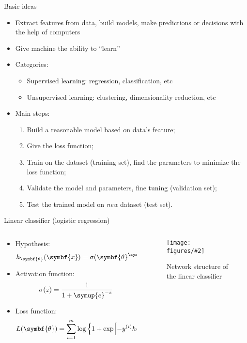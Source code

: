 \documentclass[aspectratio=169]{beamer}
\def\ee{{\symup{e}}}
\def\trans{{\symup{T}}}
\def\bm#1{{\symbf{#1}}}
\newcommand\imageinput[2][]{\texttt{[image: figures/\#2]}}
\begin{document}
\begin{frame}{Basic ideas}
\begin{itemize}
  \item Extract features from data, build models, make predictions or decisions with the help of
    computers
  \item Give machine the ability to ``learn''
  \item Categories:
    \begin{itemize}
      \item Supervised learning: regression, classification, etc
      \item Unsupervised learning: clustering, dimensionality reduction, etc
    \end{itemize}
  \item Main steps:
    \begin{enumerate}
      \item Build a reasonable model based on data's feature;
      \item Give the \alert{loss function};
      \item Train on the dataset (training set), find the parameters to minimize the loss function;
      \item Validate the model and parameters, fine tuning (validation set);
      \item Test the trained model on \emph{new} dataset (test set).
    \end{enumerate}
\end{itemize}
\end{frame}

\begin{frame}{Linear classifier (logistic regression)}
\begin{columns}[t]
  \begin{column}{0.52\textwidth}
    \begin{itemize}
      \item Hypothesis:
        \[ h_\bm{\theta} (\bm{x}) = \sigma(\bm{\theta}^\trans \bm{x}) \]
      \item Activation function:
        \[ \sigma(z) = \frac{1}{1+\ee^{-z}} \]
      \item Loss function:
        \[
          L(\bm{\theta})
          = \sum_{i=1}^m \log\qty\Big{1+\exp[-y^{(i)} h_\bm{\theta}\qty\big(\bm{x}^{(i)})]}
        \]
    \end{itemize}
  \end{column}
  \begin{column}{0.44\textwidth}
    \begin{figure}
      \centering
      \imageinput[width=0.9\textwidth]{linear-layer.pdf}
      \caption{Network structure of the linear classifier}
    \end{figure}
  \end{column}
\end{columns}
\end{frame}
\end{document}

